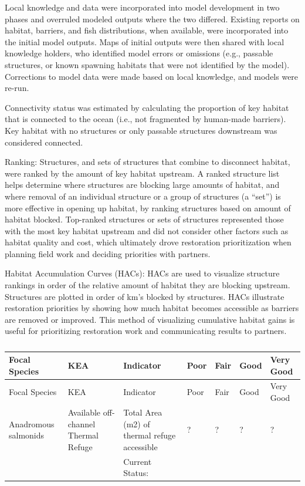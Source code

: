 \documentclass[
  letterpaper,
  DIV=11,
  numbers=noendperiod]{scrreprt}
\begin{document}
Local knowledge and data were incorporated into model development in two
phases and overruled modeled outputs where the two differed. Existing
reports on habitat, barriers, and fish distributions, when available,
were incorporated into the initial model outputs. Maps of initial
outputs were then shared with local knowledge holders, who identified
model errors or omissions (e.g., passable structures, or known spawning
habitats that were not identified by the model). Corrections to model
data were made based on local knowledge, and models were re-run.

Connectivity status was estimated by calculating the proportion of key
habitat that is connected to the ocean (i.e., not fragmented by
human-made barriers). Key habitat with no structures or only passable
structures downstream was considered connected.

Ranking: Structures, and sets of structures that combine to disconnect
habitat, were ranked by the amount of key habitat upstream. A ranked
structure list helps determine where structures are blocking large
amounts of habitat, and where removal of an individual structure or a
group of structures (a ``set'') is more effective in opening up habitat,
by ranking structures based on amount of habitat blocked. Top-ranked
structures or sets of structures represented those with the most key
habitat upstream and did not consider other factors such as habitat
quality and cost, which ultimately drove restoration prioritization when
planning field work and deciding priorities with partners.

Habitat Accumulation Curves (HACs): HACs are used to visualize structure
rankings in order of the relative amount of habitat they are blocking
upstream. Structures are plotted in order of km's blocked by structures.
HACs illustrate restoration priorities by showing how much habitat
becomes accessible as barriers are removed or improved. This method of
visualizing cumulative habitat gains is useful for prioritizing
restoration work and communicating results to partners.

\begin{longtable}[]{@{}lllllll@{}}
\caption{}\label{T_3a601}\tabularnewline
\toprule\noalign{}
Focal Species & KEA & Indicator & Poor & Fair & Good & Very Good \\
\midrule\noalign{}
\endfirsthead
\toprule\noalign{}
Focal Species & KEA & Indicator & Poor & Fair & Good & Very Good \\
\midrule\noalign{}
\endhead
\bottomrule\noalign{}
\endlastfoot
Anadromous salmonids & Available off-channel Thermal Refuge & Total Area
(m2) of thermal refuge accessible & ? & ? & ? & ? \\
& & Current Status: & & & & \\
\end{longtable}
\end{document}
